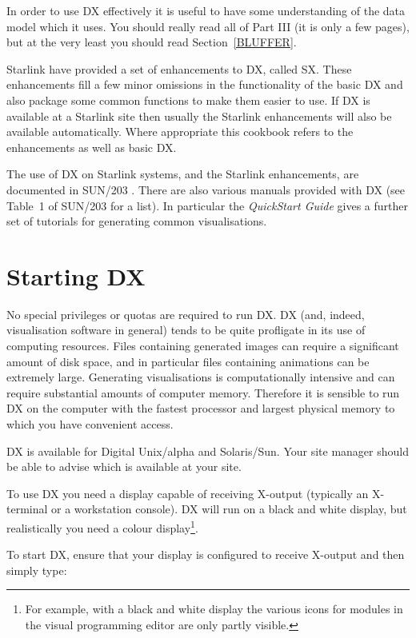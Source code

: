 \documentclass[twoside,11pt]{starlink}
\begin{document}
In order to use DX effectively it is useful to have some
understanding of the data model which it uses. You should really read
all of Part III (it is only a few pages), but at the very least you
should read Section~\ref{BLUFFER}.

Starlink have provided a set of enhancements to DX, called SX. These
enhancements fill a few minor omissions in the functionality of the basic
DX and also package some common functions to make them easier to use. If
DX is available at a Starlink site then usually the Starlink enhancements
will also be available automatically. Where appropriate this cookbook
refers to the enhancements as well as basic DX.

The use of DX on Starlink systems, and the Starlink enhancements, are
documented in SUN/203 \cite{SUN203}. There are also various manuals
provided with DX (see  Table~1 of SUN/203 for a list). In particular the
\textit{QuickStart Guide}\cite{QUICKS} gives a further set of tutorials for
generating common visualisations.


\section{\label{START}Starting DX}
No special privileges or quotas are required to run DX. DX (and, indeed,
visualisation software in general) tends to be quite profligate in its
use of computing resources. Files containing generated images can
require a significant amount of disk space, and in particular files
containing animations can be extremely large. Generating visualisations is
computationally intensive and can require substantial amounts of computer
memory. Therefore it is sensible to run DX on the computer with the
fastest processor and largest physical memory to which you have convenient
access.

DX is available for Digital Unix/alpha and Solaris/Sun.  Your site manager
should be able to advise which is available at your site.

To use DX you need a display capable of receiving X-output (typically an
X-terminal or a workstation console). DX will run on a black and white
display, but realistically you need a colour display\footnote{ For
example, with a black and white display the various icons for modules
in the visual programming editor are only partly visible.}.

To start DX, ensure that your display is configured to receive X-output
and then simply type:
\end{document}
